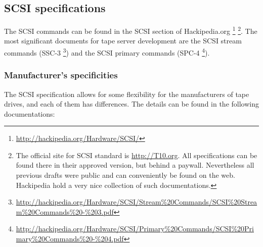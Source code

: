 \subsection{SCSI specifications}

The SCSI commands can be found in the SCSI section of Hackipedia.org
      \footnote{ \href{http://hackipedia.org/Hardware/SCSI/}{http://hackipedia.org/Hardware/SCSI/} }
      \footnote{The official site for SCSI standard is \href{http://T10.org}{http://T10.org}. All specifications
      can be found there in their approved version, but behind a paywall. Nevertheless all previous drafts were
      public and can conveniently be found on the web. Hackipedia hold a very nice collection of such
      documentations.}.
 The most significant documents for tape server development are the SCSI stream commands (SSC-3
      \footnote{ \href{http://hackipedia.org/Hardware/SCSI/Stream\%20Commands/SCSI\%20Stream\%20Commands\%20-\%203.pdf}
                      {http://hackipedia.org/Hardware/SCSI/Stream\%20Commands/SCSI\%20Stream\%20Commands\%20-\%203.pdf} })
 and the SCSI primary commands (SPC-4
      \footnote{ \href{http://hackipedia.org/Hardware/SCSI/Primary\%20Commands/SCSI\%20Primary\%20Commands\%20-\%204.pdf}
                      {http://hackipedia.org/Hardware/SCSI/Primary\%20Commands/SCSI\%20Primary\%20Commands\%20-\%204.pdf} }).

\subsubsection{Manufacturer's specificities}
\label{Manufacturer's specificities}
The SCSI specification allows for some flexibility for the manufacturers of tape drives, and 
each of them has differences. The details can be found in the following documentations:

